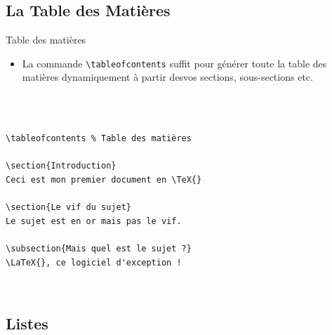 \subsection{La Table des Matières}
\begin{frame}[fragile]{Table des matières}
  \begin{itemize}
      \item La commande \lstinline|\tableofcontents| suffit pour générer toute la table des matières dynamiquement à partir desvos sections, sous-sections etc.
  \end{itemize}
  \begin{columns}
    \begin{column}{0.6\textwidth}
      \begin{lstlisting}[style=nonumbers]


\tableofcontents % Table des matières

\section{Introduction}
Ceci est mon premier document en \TeX{}

\section{Le vif du sujet}
Le sujet est en or mais pas le vif.

\subsection{Mais quel est le sujet ?}
\LaTeX{}, ce logiciel d'exception !


      \end{lstlisting}
    \end{column}
    \begin{column}{0.4\textwidth}
      \begin{center}
      \end{center}
    \end{column}
  \end{columns}
\end{frame}


\subsection{Listes}

